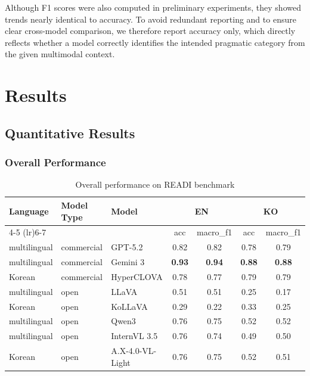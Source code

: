 \documentclass[11pt]{article}
\begin{document}
Although F1 scores were also computed in preliminary experiments, they showed trends nearly identical to accuracy. To avoid redundant reporting and to ensure clear cross-model comparison, we therefore report accuracy only, which directly reflects whether a model correctly identifies the intended pragmatic category from the given multimodal context.

\section{Results}

\subsection{Quantitative Results}
\subsubsection{Overall Performance}
\begin{table}[t]
\centering
\small
\setlength{\tabcolsep}{10pt}
\renewcommand{\arraystretch}{1.1}
\begin{tabular}{l l l cc cc}
\toprule
\multirow{2}{*}{Language} & \multirow{2}{*}{Model Type} & \multirow{2}{*}{Model}
& \multicolumn{2}{c}{\textbf{EN}} & \multicolumn{2}{c}{\textbf{KO}} \\
\cmidrule(lr){4-5} \cmidrule(lr){6-7}
& & & acc & macro\_f1 & acc & macro\_f1 \\
\midrule
multilingual & commercial & GPT-5.2            & 0.82 & 0.82 & 0.78 & 0.79 \\
multilingual & commercial & Gemini 3           & \textbf{0.93} & \textbf{0.94} & \textbf{0.88} &\textbf{0.88} \\
Korean       & commercial & HyperCLOVA         & 0.78 & 0.77 & 0.79 & 0.79 \\
\midrule
multilingual & open       & LLaVA              & 0.51 & 0.51 & 0.25 & 0.17 \\
Korean       & open       & KoLLaVA             & 0.29 & 0.22 & 0.33 & 0.25 \\
multilingual & open       & Qwen3               & 0.76 & 0.75 & 0.52 & 0.52 \\
multilingual & open       & InternVL 3.5   & 0.76 & 0.74 & 0.49 & 0.50 \\
Korean       & open       & A.X-4.0-VL-Light
                                              & 0.76 & 0.75 & 0.52 & 0.51 \\
\bottomrule
\end{tabular}
\caption{Overall performance on READI benchmark}
\label{tab:overall_performance}
\end{table}
\end{document}
